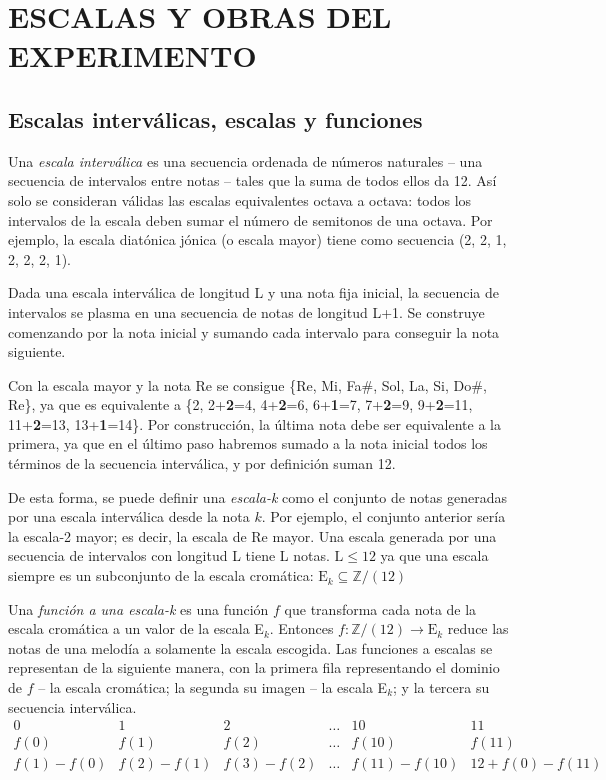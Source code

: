 	\chapter{ESCALAS Y OBRAS DEL EXPERIMENTO}
		
	\section{Escalas interválicas, escalas y funciones}
	
		Una \textit{escala interválica} es una secuencia ordenada de números naturales -- una secuencia de intervalos entre notas -- tales que la suma de todos ellos da 12. Así solo se consideran válidas las escalas equivalentes octava a octava: todos los intervalos de la escala deben sumar el número de semitonos de una octava. Por ejemplo, la escala diatónica jónica (o escala mayor) tiene como secuencia (2, 2, 1, 2, 2, 2, 1).
		
		Dada una escala interválica de longitud L y una nota fija inicial, la secuencia de intervalos se plasma en una secuencia de notas de longitud L+1. Se construye comenzando por la nota inicial y sumando cada intervalo para conseguir la nota siguiente. 
		
		Con la escala mayor y la nota Re se consigue \{Re, Mi, Fa$\#$, Sol, La, Si, Do$\#$, Re\}, ya que es equivalente a \{2, 2+\textbf{2}=4, 4+\textbf{2}=6, 6+\textbf{1}=7, 7+\textbf{2}=9, 9+\textbf{2}=11, 11+\textbf{2}=13, 13+\textbf{1}=14\}. Por construcción, la última nota debe ser equivalente a la primera, ya que en el último paso habremos sumado a la nota inicial todos los términos de la secuencia interválica, y por definición suman 12.
		
		De esta forma, se puede definir una \textit{escala-k} como el conjunto de notas generadas por una escala interválica desde la nota $k$. Por ejemplo, el conjunto anterior sería la escala-2 mayor; es decir, la escala de Re mayor. Una escala generada por una secuencia de intervalos con longitud L tiene L notas. $\text{L}\leq 12$ ya que una escala siempre es un subconjunto de la escala cromática: $\text{E}_k\subseteq\mathbb{Z}/(12)$
		
		Una \textit{función a una escala-k} es una función $f$ que transforma cada nota de la escala cromática a un valor de la escala E$_k$. Entonces $f : \mathbb{Z}/(12) \rightarrow \text{E}_k$ reduce las notas de una melodía a solamente la escala escogida. Las funciones a escalas se representan de la siguiente manera, con la primera fila representando el dominio de $f$ -- la escala cromática; la segunda su imagen -- la escala E$_k$; y la tercera su secuencia interválica.		
		$$\left.\begin{matrix}
		0&1&2&\ldots&10&11\\
		f(0)&f(1)&f(2)&\ldots&f(10)&f(11)\\
		f(1)-f(0)&f(2)-f(1)&f(3)-f(2)&\ldots&f(11)-f(10)&12+f(0)-f(11)
		\end{matrix}\right.$$
		
